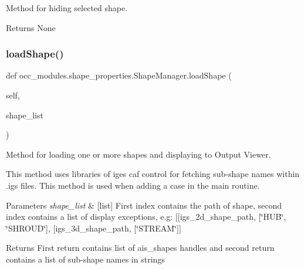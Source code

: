 Method for hiding selected shape. 

\begin{DoxyReturn}{Returns}
None 
\end{DoxyReturn}
\hypertarget{classocc__modules_1_1shape__properties_1_1_shape_manager_a8833b4dba535cb76318777c031cf08b5}{}\label{classocc__modules_1_1shape__properties_1_1_shape_manager_a8833b4dba535cb76318777c031cf08b5} 
\subsubsection{\texorpdfstring{load\+Shape()}{loadShape()}}
{\footnotesize\ttfamily def occ\+\_\+modules.\+shape\+\_\+properties.\+Shape\+Manager.\+load\+Shape (\begin{DoxyParamCaption}\item[{}]{self,  }\item[{}]{shape\+\_\+list }\end{DoxyParamCaption})}



Method for loading one or more shapes and displaying to Output Viewer. 

This method uses libraries of iges caf control for fetching sub-\/shape names within .igs files. This method is used when adding a case in the main routine.


\begin{DoxyParams}{Parameters}
{\em shape\+\_\+list} & \mbox{[}list\mbox{]} First index contains the path of shape, second index contains a list of display exceptions, e.\+g\+: \mbox{[}\mbox{[}igs\+\_\+2d\+\_\+shape\+\_\+path, \mbox{[}\char`\"{}\+H\+U\+B\char`\"{}, \char`\"{}\+S\+H\+R\+O\+U\+D\char`\"{}\mbox{]}, \mbox{[}igs\+\_\+3d\+\_\+shape\+\_\+path, \mbox{[}\char`\"{}\+S\+T\+R\+E\+A\+M\char`\"{}\mbox{]}\mbox{]} \\
\hline
\end{DoxyParams}
\begin{DoxyReturn}{Returns}
First return contains list of ais\+\_\+shapes handles and second return contains a list of sub-\/shape names in strings 
\end{DoxyReturn}
\hypertarget{classocc__modules_1_1shape__properties_1_1_shape_manager_ac659823f3085963daf751a6a94b366a7}{}\label{classocc__modules_1_1shape__properties_1_1_shape_manager_ac659823f3085963daf751a6a94b366a7} 

